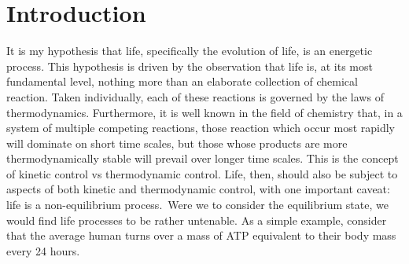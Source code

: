 \chapter{Introduction} %
\label{cha:introduction}
It is my hypothesis that life, specifically the evolution of life, is an energetic process. This hypothesis is driven by the observation that life is, at its most fundamental level, nothing more than an elaborate collection of chemical reaction. Taken individually, each of these reactions is governed by the laws of thermodynamics. Furthermore, it is well known in the field of chemistry that, in a system of multiple competing reactions, those reaction which occur most rapidly will dominate on short time scales, but those whose products are more thermodynamically stable will prevail over longer time scales. This is the concept of kinetic control vs thermodynamic control. Life, then, should also be subject to aspects of both kinetic and thermodynamic control, with one important caveat: life is a non-equilibrium process.\
Were we to consider the equilibrium state, we would find life processes to be rather untenable. As a simple example, consider that the average human turns over a mass of ATP equivalent to their body mass every 24 hours.
